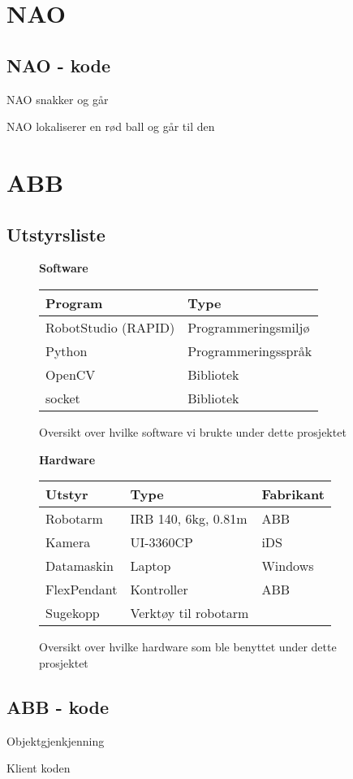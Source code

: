 \section{NAO}
\subsection{NAO - kode}
NAO snakker og går

NAO lokaliserer en rød ball og går til den


\section{ABB}
\subsection{Utstyrsliste}
\begin{figure}[!htb]
    \centering
    \textbf{Software}\par\medskip 
    \begin{tabular}{|l|l|}
        \hline
        \textbf{Program} & \textbf{Type}\\
        \hline
        RobotStudio (RAPID) & Programmeringsmiljø\\
        \hline
        Python & Programmeringsspråk \\
        \hline
        OpenCV & Bibliotek \\
        \hline
        socket & Bibliotek \\
        \hline
    \end{tabular}
    \label{app:soft}
    \caption{Oversikt over hvilke software vi brukte under dette prosjektet}
\end{figure}
\begin{figure}[!htb]
    \centering
    \textbf{Hardware}\par\medskip 
    \begin{tabular}{|l|l|l|}
        \hline
        \textbf{Utstyr} & \textbf{Type} & \textbf{Fabrikant}\\
        \hline
        Robotarm & IRB 140, 6kg, 0.81m & ABB\\
        \hline
        Kamera & UI-3360CP & iDS\\
        \hline
        Datamaskin & Laptop & Windows \\
        \hline
        FlexPendant & Kontroller & ABB \\
        \hline
        Sugekopp & Verktøy til robotarm &  \\
        \hline
    \end{tabular}
    \label{app:hard}
    \caption{Oversikt over hvilke hardware som ble benyttet under dette prosjektet}
\end{figure}

\subsection{ABB - kode}
Objektgjenkjenning

Klient koden
